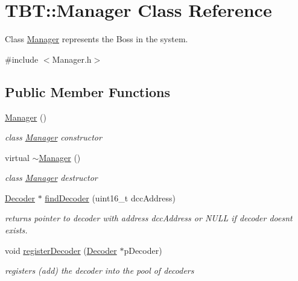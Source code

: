 \hypertarget{classTBT_1_1Manager}{}\section{T\+BT\+:\+:Manager Class Reference}
\label{classTBT_1_1Manager}


Class \hyperlink{classTBT_1_1Manager}{Manager} represents \textquotesingle{}the Boss\textquotesingle{} in the system.  




{\ttfamily \#include $<$Manager.\+h$>$}

\subsection*{Public Member Functions}
\begin{DoxyCompactItemize}
\item 
\hyperlink{classTBT_1_1Manager_a9e6016c4b93e9fff6338c5413d1a1f78_a9e6016c4b93e9fff6338c5413d1a1f78}{Manager} ()
\begin{DoxyCompactList}\small\item\em class \hyperlink{classTBT_1_1Manager}{Manager} constructor \end{DoxyCompactList}\item 
virtual \hyperlink{classTBT_1_1Manager_a431bd969c21eec974597b15d2208f19f_a431bd969c21eec974597b15d2208f19f}{$\sim$\+Manager} ()
\begin{DoxyCompactList}\small\item\em class \hyperlink{classTBT_1_1Manager}{Manager} destructor \end{DoxyCompactList}\item 
\hyperlink{classTBT_1_1Decoder}{Decoder} $\ast$ \hyperlink{classTBT_1_1Manager_a04d5ae5069f1f17ee682f4ae68141687_a04d5ae5069f1f17ee682f4ae68141687}{find\+Decoder} (uint16\+\_\+t dcc\+Address)
\begin{DoxyCompactList}\small\item\em returns pointer to decoder with address dcc\+Address or N\+U\+LL if decoder doesn\textquotesingle{}t exists. \end{DoxyCompactList}\item 
void \hyperlink{classTBT_1_1Manager_a7b20f8a47d78cfd39649722a9fba2f7c_a7b20f8a47d78cfd39649722a9fba2f7c}{register\+Decoder} (\hyperlink{classTBT_1_1Decoder}{Decoder} $\ast$p\+Decoder)
\begin{DoxyCompactList}\small\item\em registers (add) the decoder into the pool of decoders \end{DoxyCompactList}\item 

\end{DoxyCompactItemize}
